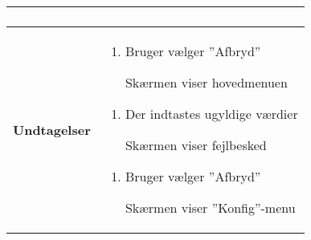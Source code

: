 \begin{center}
\begin{longtable}{|p{5cm}|p{9cm}|}
\begin{enumerate}
	
			\end{enumerate}\\\hline
		\textbf{Undtagelser}
			&\begin{enumerate}[label=\ref{uc2afbryd}.a]
				
				\item Bruger vælger ''Afbryd''
				
					\subitem Skærmen viser hovedmenuen
			\end{enumerate}
			
			\begin{enumerate}[label=\ref{uc2afbryd2}.a]
				
				\item Der indtastes ugyldige værdier	
				
					\subitem Skærmen viser fejlbesked
			\end{enumerate}			
			
			\begin{enumerate}[label=\ref{uc2afbryd3}.a]
				
				\item Bruger vælger ''Afbryd''
				
				\subitem Skærmen viser ''Konfig''-menu
				

			\end{enumerate}														\\\hline
	\end{longtable}
\end{center}

